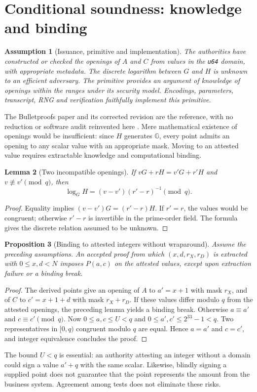 \documentclass[11pt,a4paper]{article}
\newtheorem{theorem}{Proposition}
\newtheorem{lemma}[theorem]{Lemma}
\newtheorem{assumption}[theorem]{Assumption}
\newcommand{\code}[1]{\nolinkurl{#1}}
\begin{document}
\section{Conditional soundness: knowledge and binding}
\begin{assumption}[Issuance, primitive and implementation]
The authorities have constructed or checked the openings of $A$ and $C$
from values in the \code{u64} domain, with appropriate metadata.
The discrete logarithm between $G$ and $H$ is unknown to an efficient adversary.
The primitive provides an argument of knowledge of openings within the ranges
under its security model. Encodings, parameters, transcript, RNG and
verification faithfully implement this primitive.
\end{assumption}
The Bulletproofs paper and its corrected revision are the reference, with
no reduction or software audit reinvented here \cite{bulletproofs}.
Mere mathematical existence of openings would be insufficient: since
$H$ generates $\mathbb G$, every point admits an opening to any scalar
value with an appropriate mask. Moving to an attested value requires
extractable knowledge and computational binding.

\begin{lemma}[Two incompatible openings]
If $vG+rH=v'G+r'H$ and $v\not\equiv v'\pmod q$, then
\[
 \log_G H=(v-v')(r'-r)^{-1}\pmod q.
\]
\end{lemma}
\begin{proof}
Equality implies $(v-v')G=(r'-r)H$. If $r'=r$, the values would
be congruent; otherwise $r'-r$ is invertible in the prime-order field.
The formula gives the discrete relation assumed to be unknown.
\end{proof}

\begin{theorem}[Binding to attested integers without wraparound]
Assume the preceding assumptions. An accepted proof from which
$(x,d,r_X,r_D)$ is extracted with $0\le x,d<N$ imposes $P(a,c)$
on the attested values, except upon extraction failure or a binding break.
\end{theorem}
\begin{proof}
The derived points give an opening of $A$ to $a'=x+1$ with mask
$r_X$, and of $C$ to $c'=x+1+d$ with mask $r_X+r_D$. If these values
differ modulo $q$ from the attested openings, the preceding lemma yields
a binding break. Otherwise $a\equiv a'$ and $c\equiv c'\pmod q$.
Now $0\le a,c\le U<q$ and $0\le a',c'\le2^{33}-1<q$.
Two representatives in $[0,q)$ congruent modulo $q$ are equal.
Hence $a=a'$ and $c=c'$, and integer equivalence concludes the proof.
\end{proof}
The bound $U<q$ is essential: an authority attesting an integer without
a domain could sign a value $a'+q$ with the same scalar. Likewise,
blindly signing a supplied point does not guarantee that the point
represents the amount from the business system. Agreement among tests
does not eliminate these risks.
\end{document}
